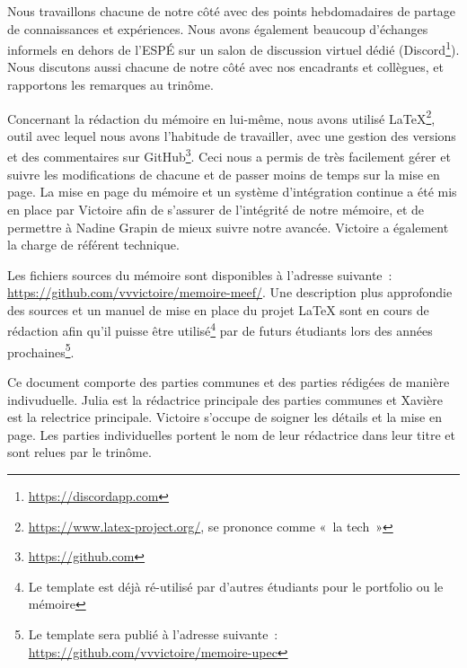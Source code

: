 Nous travaillons chacune de notre côté avec des points hebdomadaires de partage de connaissances et expériences. Nous avons également beaucoup d’échanges informels en dehors de l’ESPÉ sur un salon de discussion virtuel dédié (Discord\footnote{\url{https://discordapp.com}}). Nous discutons aussi chacune de notre côté avec nos encadrants et collègues, et rapportons les remarques au trinôme.

Concernant la rédaction du mémoire en lui-même, nous avons utilisé \LaTeX\footnote{\url{https://www.latex-project.org/}, se prononce comme « la tech »},
outil avec lequel nous avons l’habitude de travailler, avec une gestion des versions et des commentaires sur GitHub\footnote{\url{https://github.com}}. Ceci nous a permis de très facilement gérer et suivre les modifications de chacune et de passer moins de temps sur la mise en page. La mise en page du mémoire et un système d'intégration continue a été mis en place par Victoire afin de s'assurer de l'intégrité de notre mémoire, et de permettre à Nadine Grapin de mieux suivre notre avancée. Victoire a également la charge de référent technique.

Les fichiers sources du mémoire sont disponibles à l'adresse suivante : \url{https://github.com/vvvictoire/memoire-meef/}. Une description plus approfondie des sources et un manuel de mise en place du projet \LaTeX{} sont en cours de rédaction afin qu'il puisse être utilisé\footnote{Le template est déjà ré-utilisé par d'autres étudiants pour le portfolio ou le mémoire} par de futurs étudiants lors des années prochaines\footnote{Le template sera publié à l'adresse
suivante : \url{https://github.com/vvvictoire/memoire-upec}}.

Ce document comporte des parties communes et des parties rédigées de manière indivuduelle. Julia est la rédactrice principale des parties communes et Xavière est la relectrice principale.
Victoire s'occupe de soigner les détails et la mise en page. Les parties individuelles portent le nom de leur rédactrice dans leur titre et sont relues par le trinôme.
